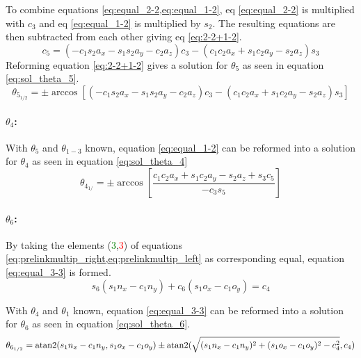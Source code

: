 To combine equations \cref{eq:equal_2-2,eq:equal_1-2}, eq \ref{eq:equal_2-2} is multiplied with $c_3$ and eq \ref{eq:equal_1-2} is multiplied by $ s_2$. The resulting equations are then subtracted from each other giving eq \ref{eq:2-2+1-2}.
\begin{equation}\label{eq:2-2+1-2}
	c_5 = (-c_1 s_2 a_x - s_1 s_2 a_y -c_2 a_z) c_3 - (c_1 c_2 a_x +s_1 c_2 a_y - s_2 a_z) s_3
\end{equation}
Reforming equation \ref{eq:2-2+1-2} gives a solution for $\theta_5$ as seen in equation \ref{eq:sol_theta_5}.
\begin{equation}\label{eq:sol_theta_5}
	\theta_{5_{1/2}} = \pm \arccos [ ( -c_1 s_2 a_x - s_1 s_2 a_y - c_2 a_z) c_3 - (c_1 c_2 a_x + s_1 c_2 a_y - s_2 a_z) s_3]
\end{equation}

\paragraph{$\theta_4$:}

With $\theta_5$ and $\theta_{1-3}$ known, equation \ref{eq:equal_1-2} can be reformed into a solution for $\theta_4$ as seen in equation \ref{eq:sol_theta_4}
\begin{equation}\label{eq:sol_theta_4}
	\theta_{4_{1/}} = \pm \arccos [ \frac{ c_1 c_2 a_x + s_1 c_2 a_y - s_2 a_z + s_3 c_5}{-c_3 s_5}]
\end{equation}

\paragraph{$\theta_6$:}
By taking the elements (\textcolor{green}{3},\textcolor{red}{3}) of equations \cref{eq:prelinkmultip_right,eq:prelinkmultip_left} as corresponding equal, equation \ref{eq:equal_3-3} is formed.
\begin{equation} \label{eq:equal_3-3}
	s_6 (s_1 n_x - c_1 n_y) + c_6 (s_1 o_x - c_1 o_y ) = c_4
\end{equation}

With $\theta_4$ and $\theta_1$ known, equation \ref{eq:equal_3-3} can be reformed into a solution for $\theta_6$ as seen in equation \ref{eq:sol_theta_6}.
\begin{equation}\label{eq:sol_theta_6}
	\theta_{6_{1/2}} = \operatorname{atan2}(s_1 n_x -c_1 n_y , s_1 o_x -c_1 o_y) \pm \operatorname{atan2}(\sqrt{(s_1 n_x - c_1 n_y)^2 + (s_1 o_x - c_1 o_y )^2 - c_4^2} , c_4)
\end{equation}

